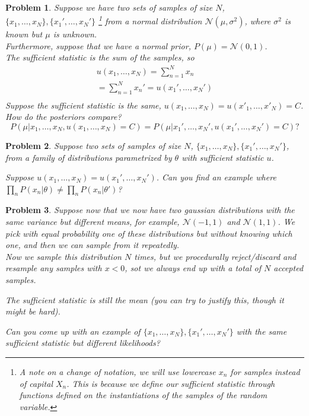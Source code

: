 \documentclass[a4paper]{article}
\newtheorem{problem}{Problem}[section]
\begin{document}
\begin{problem}
  Suppose we have two sets of samples of size $N$, $\{x_1,\ldots,x_N\},\{x_1',\ldots,x_N'\}$ \footnote{A note on a change of notation, we will use lowercase $x_n$ for samples instead of capital $X_n$.  This is because we define our sufficient statistic through functions defined on the instantiations of the samples of the random variable.} from a normal distribution $\mathcal{N}( \mu, \sigma^2 )$, where $\sigma^2$ is known but $\mu$ is unknown.  \\
  Furthermore, suppose that we have a normal prior, $P(\mu) = \mathcal{N}(0,1)$.  \\
  The sufficient statistic is the sum of the samples, so 
\begin{equation}
  \begin{split}
    u(x_1,\ldots,x_N) = \sum_{n=1}^N x_n \\
    = \sum_{n=1}^N x_n' = u(x_1',\ldots,x_N') \\
  \end{split}
  \label{}
\end{equation}
Suppose the sufficient statistic is the same, $u(x_1,\ldots,x_N) = u(x'_1,\ldots,x'_N) = C$.  How do the posteriors compare?
\begin{equation}
  P( \mu \vert x_1,\ldots,x_N, u(x_1,\ldots,x_N) = C ) = P( \mu \vert x_1',\ldots,x_N', u(x_1',\ldots,x_N') = C ) ?
  \label{}
\end{equation}

\end{problem}

\begin{problem}
Suppose two sets of samples of size $N$, $\{x_1,\ldots,x_N\},\{x_1',\ldots,x_N'\}$, from a family of distributions parametrized by $\theta$ with sufficient statistic $u$.

Suppose $u(x_1,\ldots,x_N) = u(x_1',\ldots,x_N')$.  Can you find an example where $ \prod_n P(x_n \vert \theta) \neq \prod_n P(x_n \vert \theta') $?
\end{problem}

\begin{problem}
  Suppose now that we now have two gaussian distributions with the same variance but different means, for example, $\mathcal{N}(-1,1)$ and $\mathcal{N}(1,1)$.  We pick with equal probability one of these distributions but without knowing which one, and then we can sample from it repeatedly. \\
Now we sample this distribution $N$ times, but we procedurally reject/discard and resample any samples with $x<0$,  sot we always end up with a total of $N$ accepted samples.

The sufficient statistic is still the mean (you can try to justify this, though it might be hard).

Can you come up with an example of $\{x_1,\ldots,x_N\}, \{x_1',\ldots,x_N'\}$ with the same sufficient statistic but different likelihoods?
\end{problem}
\end{document}

